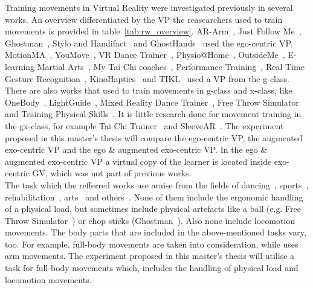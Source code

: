 Training movements in Virtual Reality were investigated previously in several works. An overview differentiated by the VP the reasearchers used to train movements is provided in table~\ref{tab:rw_overview}. AR-Arm~\cite{ararm}, Just Follow Me~\cite{justfollowme}, Ghostman~\cite{ghostman}, Stylo and Handifact~\cite{stylo} and GhostHands~\cite{ghosthands} used the ego-centric VP. MotionMA~\cite{motionma}, YouMove~\cite{YouMove}, VR Dance Trainer~\cite{vrdancetrainer}, Physio@Home~\cite{physioathome}, OutsideMe~\cite{outsideme}, E-learning Martial Arts~\cite{elearningma}, My Tai Chi coaches~\cite{mythaichicoaches}, Performance Training~\cite{performancetraining}, Real Time Gesture Recognition~\cite{rtgesturerecognistion}, KinoHaptics~\cite{kinohaptics} and TIKL~\cite{tikl} used a VP from the g-class. There are also works that used to train movements in g-class and x-class, like OneBody~\cite{onebody}, LightGuide~\cite{lightguide}, Mixed Reality Dance Trainer~\cite{mrdancetrainer}, Free Throw Simulator~\cite{freethrowsimulator} and Training Physical Skills~\cite{trainingphysicalskills}. It is little research done for movement training in the gx-class, for example Tai Chi Trainer~\cite{thaichichua} and SleeveAR~\cite{sleevear}. The experiment proposed in this master's thesis will compare the ego-centric VP, the augmented exo-centric VP and the ego \& augmented exo-centric VP. In the ego \& augmented exo-centric VP a virtual copy of the learner is located inside exo-centric GV, which was not part of previous works.\\

The task which the refferred works use araise from the fields of dancing~\cite{YouMove,vrdancetrainer,outsideme,performancetraining,mrdancetrainer}, sports~\cite{freethrowsimulator,trainingphysicalskills}, rehabilitation~\cite{motionma,physioathome,kinohaptics,sleevear,veimprovesml}, arts~\cite{ararm,justfollowme,stylo,elearningma,mythaichicoaches,rtgesturerecognistion,onebody,thaichichua} and others~\cite{tikl,lightguide}. None of them include the ergonomic handling of a physical load, but sometimes include physical artefacts like a ball (e.g. Free Throw Simulator~\cite{freethrowsimulator}) or chop sticks (Ghostman~\cite{ghostman}). Also none include locomotion movements. The body parts that are included in the above-mentioned tasks vary, too. For example, \cite{YouMove, thaichichua,onebody,vrdancetrainer} full-body movements are taken into consideration, while \cite{ararm,sleevear,ghosthands} uses arm movements. The experiment proposed in this master's thesis will utilise a task for full-body movements which, includes the handling of physical load and locomotion movements.\\

